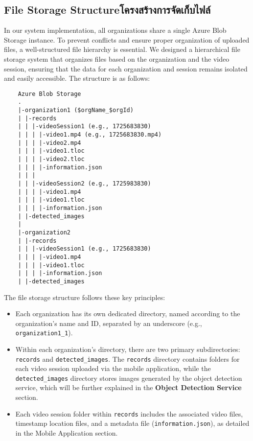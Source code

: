 \subsection{\ifenglish File Storage Structure\else โครงสร้างการจัดเก็บไฟล์\fi}

In our system implementation, all organizations share a single Azure Blob Storage instance. To prevent conflicts and ensure proper organization of uploaded files, a well-structured file hierarchy is essential. We designed a hierarchical file storage system that organizes files based on the organization and the video session, ensuring that the data for each organization and session remains isolated and easily accessible. The structure is as follows:

\begin{lstlisting}
    Azure Blob Storage
    .
    |-organization1 ($orgName_$orgId)
    | |-records
    | | |-videoSession1 (e.g., 1725683830)
    | | | |-video1.mp4 (e.g., 1725683830.mp4)
    | | | |-video2.mp4
    | | | |-video1.tloc
    | | | |-video2.tloc
    | | | |-information.json
    | | |
    | | |-videoSession2 (e.g., 1725983830)
    | | | |-video1.mp4
    | | | |-video1.tloc
    | | | |-information.json
    | |-detected_images
    |
    |-organization2
    | |-records
    | | |-videoSession1 (e.g., 1725683830)
    | | | |-video1.mp4
    | | | |-video1.tloc
    | | | |-information.json
    | |-detected_images
\end{lstlisting}

The file storage structure follows these key principles:

\begin{itemize}
    \item Each organization has its own dedicated directory, named according to the organization's name and ID, separated by an underscore (e.g., \texttt{organization1\_1}).
    \item Within each organization's directory, there are two primary subdirectories: \texttt{records} and \texttt{detected\_images}. The \texttt{records} directory contains folders for each video session uploaded via the mobile application, while the \texttt{detected\_images} directory stores images generated by the object detection service, which will be further explained in the \textbf{Object Detection Service} section.
    \item Each video session folder within \texttt{records} includes the associated video files, timestamp location files, and a metadata file (\texttt{information.json}), as detailed in the Mobile Application section.
\end{itemize}
